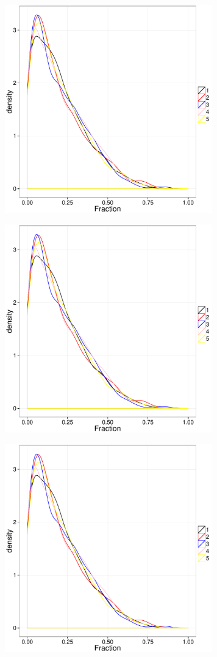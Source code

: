 \begin{figure}[ht!]
    \centering
    \begin{subfigure}[t]{0.48\textwidth}
        \includegraphics[page=1,height=9cm,width=\textwidth]{background/Figures/Priors_Color.pdf}
        \caption{}
    \end{subfigure}
    \begin{subfigure}[t]{0.48\textwidth}
      \includegraphics[page=2,height=9cm,width=\textwidth]{background/Figures/Priors_Color.pdf}
        \caption{}
    \end{subfigure}
     \begin{subfigure}[t]{0.48\textwidth}
      \includegraphics[page=3,height=9cm,width=\textwidth]{background/Figures/Priors_Color.pdf}

\end{subfigure}
\end{figure}
